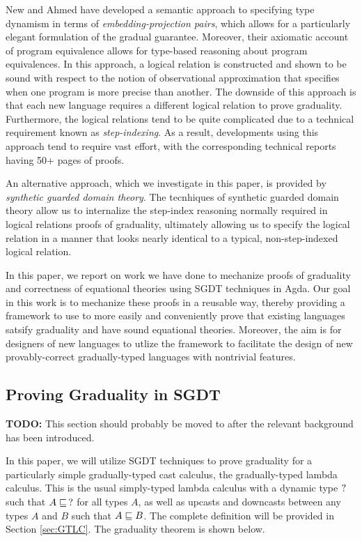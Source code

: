 New and Ahmed \cite{new-ahmed2018}
have developed a semantic approach to specifying type dynamism in terms of
\emph{embedding-projection pairs}, which allows for a particularly elegant formulation of the
gradual guarantee.
Moreover, their axiomatic account of program equivalence allows for type-based reasoning
about program equivalences.
%
In this approach, a logical relation is constructed and shown to be sound with respect to
the notion of observational approximation that specifies when one program is more precise than another.
The downside of this approach is that each new language requires a different logical relation
to prove graduality. Furthermore, the logical relations tend to be quite complicated due
to a technical requirement known as \emph{step-indexing}.
As a result, developments using this approach tend to require vast effort, with the
corresponding technical reports having 50+ pages of proofs.

An alternative approach, which we investigate in this paper, is provided by
\emph{synthetic guarded domain theory}.
The tecnhiques of synthetic guarded domain theory allow us to internalize the
step-index reasoning normally required in logical relations proofs of graduality,
ultimately allowing us to specify the logical relation in a manner that looks nearly
identical to a typical, non-step-indexed logical relation.

In this paper, we report on work we have done to mechanize proofs of graduality and
correctness of equational theories using SGDT techniques in Agda.
Our goal in this work is to mechanize these proofs in a reusable way,
thereby providing a framework to use to more easily and
conveniently prove that existing languages satsify graduality and have
sound equational theories. Moreover, the aim is for designers of new languages
to utlize the framework to facilitate the design of new provably-correct
gradually-typed languages with nontrivial features.


\subsection{Proving Graduality in SGDT}
\textbf{TODO:} This section should probably be moved to after the relevant background has been introduced.


In this paper, we will utilize SGDT techniques to prove graduality for a particularly
simple gradually-typed cast calculus, the gradually-typed lambda calculus.
This is the usual simply-typed lambda calculus with a dynamic type $?$ such that
$A \sqsubseteq\, ?$ for all types $A$, as well as upcasts and downcasts between any types
$A$ and $B$ such that $A \sqsubseteq B$. The complete definition will be provided in
Section \ref{sec:GTLC}.
The graduality theorem is shown below.


